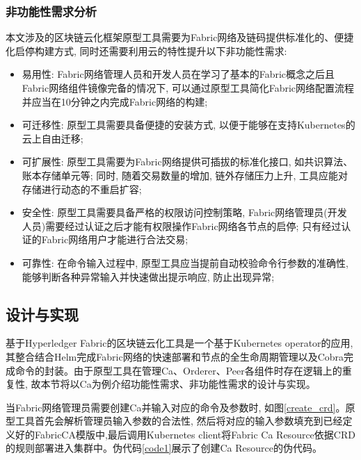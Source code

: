 \subsubsection{非功能性需求分析}

本文涉及的区块链云化框架原型工具需要为Fabric网络及链码提供标准化的、便捷化启停构建方式, 同时还需要利用云的特性提升以下非功能性需求:

\begin{itemize}[itemindent=2em]
    \item 易用性: Fabric网络管理人员和开发人员在学习了基本的Fabric概念之后且Fabric网络组件镜像完备的情况下, 可以通过原型工具简化Fabric网络配置流程并应当在10分钟之内完成Fabric网络的构建;

    \item 可迁移性: 原型工具需要具备便捷的安装方式, 以便于能够在支持Kubernetes的云上自由迁移;

    \item 可扩展性: 原型工具需要为Fabric网络提供可插拔的标准化接口, 如共识算法、账本存储单元等; 同时, 随着交易数量的增加, 链外存储压力上升, 工具应能对存储进行动态的不重启扩容;

    \item 安全性: 原型工具需要具备严格的权限访问控制策略, Fabric网络管理员(开发人员)需要经过认证之后才能有权限操作Fabric网络各节点的启停; 只有经过认证的Fabric网络用户才能进行合法交易;

    \item 可靠性: 在命令输入过程中, 原型工具应当提前自动校验命令行参数的准确性, 能够判断各种异常输入并快速做出提示响应, 防止出现异常;

\end{itemize}


\subsection{设计与实现}

基于Hyperledger Fabric的区块链云化工具是一个基于Kubernetes operator的应用, 其整合结合Helm完成Fabric网络的快速部署和节点的全生命周期管理以及Cobra\footnotemark[1]完成命令的封装。由于原型工具在管理Ca、Orderer、Peer各组件时存在逻辑上的重复性, 故本节将以Ca为例介绍功能性需求、非功能性需求的设计与实现。

当Fabric网络管理员需要创建Ca并输入对应的命令及参数时, 如图\ref{create_crd}。原型工具首先会解析管理员输入参数的合法性, 然后将对应的输入参数填充到已经定义好的FabricCA模版中,最后调用Kubernetes client将Fabric Ca Resource依据CRD的规则部署进入集群中。伪代码\ref{code1}展示了创建Ca Resource的伪代码。

